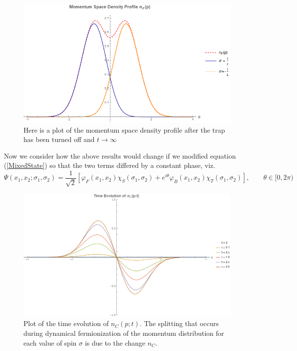 \documentclass[onecolumn,english,aps,pra]{revtex4}
\begin{document}
\begin{figure}[h]
\includegraphics[scale=0.6]{"../Plots/MomentumSpaceDProfileMixedSpinorDF"}
\caption{Here is a plot of the momentum space density profile after the trap has been turned off and $t \rightarrow \infty$}
\label{fig:nsRSDP-DF}
\end{figure}

Now we consider how the above results would change if we modified equation (\ref{MixedState}) so that the two terms differed by a constant phase, viz.
\begin{equation}
\Psi(x_1, x_2; \sigma_1, \sigma_2) = \frac{1}{\sqrt{2}}\left[\varphi_F(x_1, x_2) \chi_S(\sigma_1, \sigma_2) + e^{i\theta	}\varphi_B(x_1,x_2) \chi_T(\sigma_1, \sigma_2)\right], \qquad \theta \in [0,2\pi)
\end{equation}


\begin{figure}[h]
\includegraphics[scale=0.45]{"../Plots/TimeEvolutionNC"}
\caption{Plot of the time evolution of $n_{C}(p;t)$. The splitting that occurs during dynamical fermionization of the momentum distribution for each value of spin $\sigma$ is due to the change $n_C$.}
\label{fig:ncRSDP-DF}
\end{figure}

\pagebreak


\end{document}

